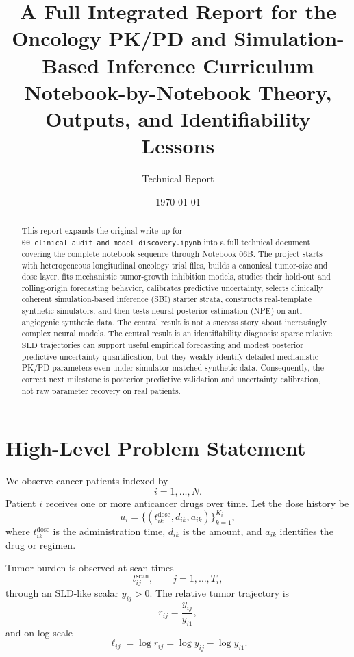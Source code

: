 \documentclass[11pt,a4paper]{article}
\title{A Full Integrated Report for the Oncology PK/PD and Simulation-Based Inference Curriculum\\\large Notebook-by-Notebook Theory, Outputs, and Identifiability Lessons}
\author{Technical Report}
\date{\today}
\newcommand{\sld}{\ensuremath{\mathrm{SLD}}}
\begin{document}
\maketitle

\begin{abstract}
This report expands the original write-up for \texttt{00\_clinical\_audit\_and\_model\_discovery.ipynb} into a full technical document covering the complete notebook sequence through Notebook 06B. The project starts with heterogeneous longitudinal oncology trial files, builds a canonical tumor-size and dose layer, fits mechanistic tumor-growth inhibition models, studies their hold-out and rolling-origin forecasting behavior, calibrates predictive uncertainty, selects clinically coherent simulation-based inference (SBI) starter strata, constructs real-template synthetic simulators, and then tests neural posterior estimation (NPE) on anti-angiogenic synthetic data. The central result is not a success story about increasingly complex neural models. The central result is an identifiability diagnosis: sparse relative \sld{} trajectories can support useful empirical forecasting and modest posterior predictive uncertainty quantification, but they weakly identify detailed mechanistic PK/PD parameters even under simulator-matched synthetic data. Consequently, the correct next milestone is posterior predictive validation and uncertainty calibration, not raw parameter recovery on real patients.
\end{abstract}

\tableofcontents
\newpage

\section{High-Level Problem Statement}

We observe cancer patients indexed by
\[
    i=1,\ldots,N.
\]
Patient $i$ receives one or more anticancer drugs over time. Let the dose history be
\[
    u_i=\{(t_{ik}^{\mathrm{dose}},d_{ik},a_{ik})\}_{k=1}^{K_i},
\]
where $t_{ik}^{\mathrm{dose}}$ is the administration time, $d_{ik}$ is the amount, and $a_{ik}$ identifies the drug or regimen.

Tumor burden is observed at scan times
\[
    t_{ij}^{\mathrm{scan}}, \qquad j=1,\ldots,T_i,
\]
through an \sld-like scalar $y_{ij}>0$. The relative tumor trajectory is
\[
    r_{ij}=\frac{y_{ij}}{y_{i1}},
\]
and on log scale
\[
    \ell_{ij}=\log r_{ij}=\log y_{ij}-\log y_{i1}.
\]
\end{document}
